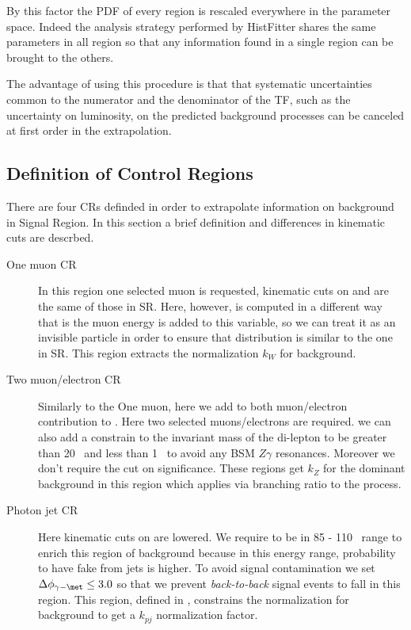 By this factor the PDF of every region is rescaled everywhere in the parameter space. Indeed the analysis strategy performed by HistFitter shares the same parameters in all region so that any information found in a single region can be brought to the others.

The advantage of using this procedure is that that systematic uncertainties common to the numerator and the denominator of the TF, such as the uncertainty on luminosity, on the predicted background processes can be canceled at first order in the extrapolation.

\subsection{Definition of Control Regions}
There are four CRs definded in order to extrapolate information on background in Signal Region. In this section a brief definition and differences in kinematic cuts are descrbed.

\begin{description}
\item [One muon CR] In this region one selected muon is requested, kinematic cuts on \pt and \met are the same of those in SR. Here, however, \met is computed in a different way that is the muon energy is added to this variable, so we can treat it as an invisible particle in order to ensure that \met distribution is similar to the one in SR. This region extracts the normalization $k_W$ for \wg background.
\item [Two muon/electron CR] Similarly to the One muon, here we add to \met both muon/electron contribution to \met. Here two selected muons/electrons are required. we can also add a constrain to the invariant mass of the di-lepton to be greater than 20 \GeV\, and less than 1 \TeV \, to avoid any BSM $Z\gamma$ resonances. Moreover we don't require the cut on \met significance. These regions get $k_Z$ for the dominant background \zg in this region which applies via branching ratio to the \znng process.
\item [Photon jet CR] Here kinematic cuts on \met are lowered. We require \met to be in 85 - 110 \GeV\, range to enrich this region of \gj background because in this energy range, probability to have fake \met from jets is higher. To avoid signal contamination we set $\Delta\phi_{\gamma - \met} \le 3.0$ so that we prevent {\itshape back-to-back} signal events to fall in this region. This region, defined in \RunTwo, constrains the normalization for \gj background to get a $k_{pj}$ normalization factor.
\end{description}


